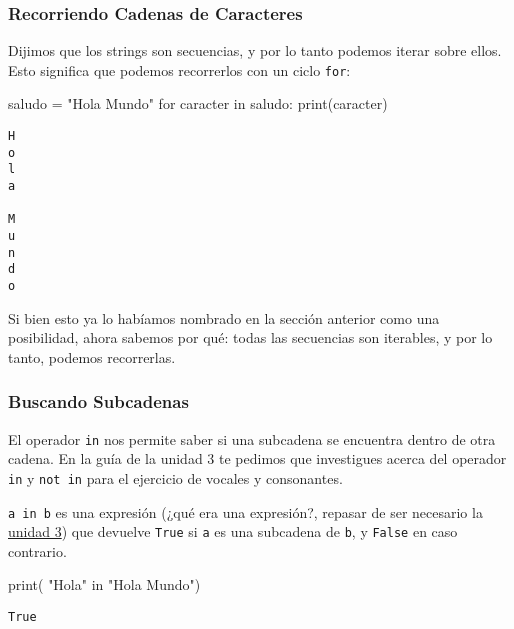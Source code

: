 \documentclass[
  letterpaper,
  DIV=11,
  numbers=noendperiod]{scrreprt}
\newenvironment{Shaded}{\begin{snugshade}}{\end{snugshade}}
\newcommand{\BuiltInTok}[1]{\textcolor[rgb]{0.00,0.23,0.31}{#1}}
\newcommand{\ControlFlowTok}[1]{\textcolor[rgb]{0.00,0.23,0.31}{#1}}
\newcommand{\KeywordTok}[1]{\textcolor[rgb]{0.00,0.23,0.31}{#1}}
\newcommand{\NormalTok}[1]{\textcolor[rgb]{0.00,0.23,0.31}{#1}}
\newcommand{\OperatorTok}[1]{\textcolor[rgb]{0.37,0.37,0.37}{#1}}
\newcommand{\StringTok}[1]{\textcolor[rgb]{0.13,0.47,0.30}{#1}}
\begin{document}
\subsubsection{Recorriendo Cadenas de
Caracteres}\label{recorriendo-cadenas-de-caracteres}

Dijimos que los strings son secuencias, y por lo tanto podemos iterar
sobre ellos. Esto significa que podemos recorrerlos con un ciclo
\texttt{for}:

\begin{Shaded}
\begin{Highlighting}[]
\NormalTok{saludo }\OperatorTok{=} \StringTok{"Hola Mundo"}
\ControlFlowTok{for}\NormalTok{ caracter }\KeywordTok{in}\NormalTok{ saludo:}
    \BuiltInTok{print}\NormalTok{(caracter)}
\end{Highlighting}
\end{Shaded}

\begin{verbatim}
H
o
l
a
 
M
u
n
d
o
\end{verbatim}

Si bien esto ya lo habíamos nombrado en la sección anterior como una
posibilidad, ahora sabemos por qué: todas las secuencias son iterables,
y por lo tanto, podemos recorrerlas.

\subsubsection{Buscando Subcadenas}\label{buscando-subcadenas}

El operador \texttt{in} nos permite saber si una subcadena se encuentra
dentro de otra cadena. En la guía de la unidad 3 te pedimos que
investigues acerca del operador \texttt{in} y \texttt{not\ in} para el
ejercicio de vocales y consonantes.

\texttt{a\ in\ b} es una expresión (¿qué era una expresión?, repasar de
ser necesario la \hyperref[expresiones-booleanas]{unidad 3}) que
devuelve \texttt{True} si \texttt{a} es una subcadena de \texttt{b}, y
\texttt{False} en caso contrario.

\begin{Shaded}
\begin{Highlighting}[]
\BuiltInTok{print}\NormalTok{( }\StringTok{"Hola"} \KeywordTok{in} \StringTok{"Hola Mundo"}\NormalTok{)}
\end{Highlighting}
\end{Shaded}

\begin{verbatim}
True
\end{verbatim}
\end{document}
